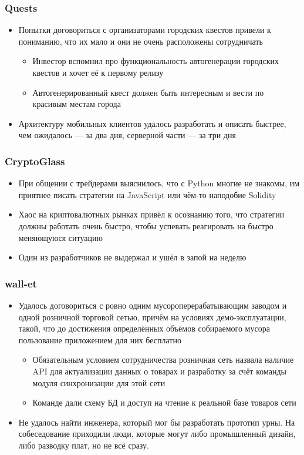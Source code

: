 \documentclass[xetex,mathserif,serif]{beamer}
\begin{document}
	\begin{frame}
		\frametitle{Quests}
		\begin{itemize}
			\item Попытки договориться с организаторами городских квестов привели к пониманию, что их мало и они не очень расположены сотрудничать
			\begin{itemize}
				\item Инвестор вспомнил про функциональность автогенерации городских квестов и хочет её к первому релизу
				\item Автогенерированный квест должен быть интересным и вести по красивым местам города
			\end{itemize}
			\item Архитектуру мобильных клиентов удалось разработать и описать быстрее, чем ожидалось --- за два дня, серверной части --- за три дня
		\end{itemize}
	\end{frame}

	\begin{frame}
		\frametitle{CryptoGlass}
		\begin{itemize}
			\item При общении с трейдерами выяснилось, что с Python многие не знакомы, им приятнее писать стратегии на JavaScript или чём-то наподобие Solidity
			\item Хаос на криптовалютных рынках привёл к осознанию того, что стратегии должны работать очень быстро, чтобы успевать реагировать на быстро меняющуюся ситуацию
			\item Один из разработчиков не выдержал и ушёл в запой на неделю
		\end{itemize}
	\end{frame}

	\begin{frame}
		\frametitle{wall-et}
		\begin{itemize}
			\item Удалось договориться с ровно одним мусороперерабатывающим заводом и одной розничной торговой сетью, причём на условиях демо-эксплуатации, такой, что до достижения определённых объёмов собираемого мусора пользование приложением для них бесплатно
			\begin{itemize}
				\item Обязательным условием сотрудничества розничная сеть назвала наличие API для актуализации данных о товарах и разработку за счёт команды модуля синхронизации для этой сети
				\item Команде дали схему БД и доступ на чтение к реальной базе товаров сети
			\end{itemize}
			\item Не удалось найти инженера, который мог бы разработать прототип урны. На собеседование приходили люди, которые могут либо промышленный дизайн, либо разводку плат, но не всё сразу. 
		\end{itemize}
	\end{frame}
\end{document}
